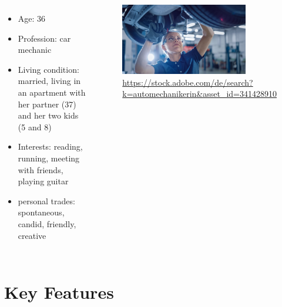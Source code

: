 \documentclass[aspectratio=169]{beamer}
\begin{document}
\begin{frame}
\begin{columns}
	\begin{itemize}
		\item Age: 36
		\item Profession: car mechanic
		\item Living condition: married, living in an apartment with her partner (37) and her two kids (5 and 8)
		\item Interests: reading, running, meeting with friends, playing guitar 
		\item personal trades: spontaneous, candid, friendly, creative
	\end{itemize}
	 \begin{figure}
		 \centering
		\includegraphics[width=0.8\textwidth]{media/car_mechanic.jpg}
		\caption{\url{https://stock.adobe.com/de/search?k=automechanikerin\&asset_id=341428910}}
	\end{figure}
\end{columns}
\end{frame}






\section{Key Features}

\end{document}
